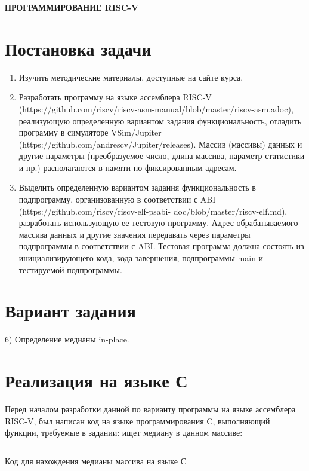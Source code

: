 \begin{center}
	\Large\textbf{\MakeUppercase{Программирование RISC-V}}
\end{center}

\section{Постановка задачи}
\begin{enumerate}
	\item Изучить методические материалы, доступные на сайте курса.
	\item Разработать программу на языке ассемблера RISC-V (https://github.com/riscv/riscv-asm-manual/blob/master/riscv-asm.adoc), реализующую определенную вариантом задания функциональность, отладить программу в симуляторе VSim/Jupiter (https://github.com/andrescv/Jupiter/releases). Массив (массивы) данных и другие параметры (преобразуемое число, длина массива, параметр статистики и пр.) располагаются в памяти по фиксированным адресам.
	\item Выделить определенную вариантом задания функциональность в подпрограмму, организованную в соответствии с ABI (https://github.com/riscv/riscv-elf-psabi- doc/blob/master/riscv-elf.md), разработать использующую ее тестовую программу. Адрес обрабатываемого массива данных и другие значения передавать через параметры подпрограммы в соответствии с ABI. Тестовая программа должна состоять из инициализирующего кода, кода завершения, подпрограммы main и тестируемой подпрограммы.
\end{enumerate}

\section{Вариант задания}
6) Определение медианы in-place.

\newpage

\section{Реализация на языке С}

Перед началом разработки данной по варианту программы на языке ассемблера RISC-V, был написан код на языке программирования C, выполняющий функции, требуемые в задании: ищет медиану в данном массиве:

\begin{code}
	\inputminted[breaklines=true, xleftmargin=1em, linenos, frame=single, framesep=10pt, fontsize=\footnotesize, firstline=1, lastline=33]{c}{listings/median.c}
	\caption{Код для нахождения медианы массива на языке С}
\end{code}

